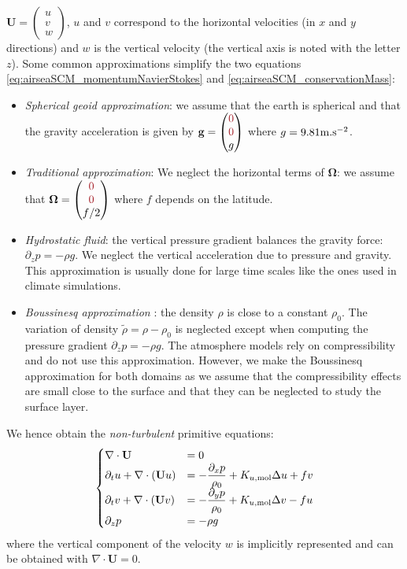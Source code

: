 $\mathbf{U} = \begin{pmatrix}u\\v\\w\end{pmatrix}$, $u$ and $v$
correspond to the horizontal velocities (in $x$ and $y$ directions)
and $w$ is the vertical velocity (the vertical axis is noted
with the letter $z$).
Some common approximations simplify the two equations
\eqref{eq:airseaSCM_momentumNavierStokes} and
\eqref{eq:airseaSCM_conservationMass}:
\begin{itemize}
\item \textit{Spherical geoid approximation}:
we assume that the earth is spherical and that the
gravity acceleration is given by
$\mathbf{g} =\begin{pmatrix}
	\emphase{0}\\ \emphase{0} \\ g
\end{pmatrix}$ where $g=9.81 {\rm m}.{\rm s}^{-2}$.
\item \textit{Traditional approximation}:
We neglect the horizontal terms of
$\mathbf{\Omega}$: we assume that
$\mathbf{\Omega} =\begin{pmatrix}
	\emphase{0}\\ \emphase{0} \\ f/2
\end{pmatrix}$ where $f$ depends on the latitude.
\item \textit{Hydrostatic fluid}:
the vertical pressure gradient balances the gravity force:
$\partial_z p = -\rho g$. We neglect the vertical
acceleration due to pressure and gravity.
This approximation is usually done for large time
scales like the ones used in climate simulations.
\item \textit{Boussinesq approximation}
\citep{boussinesq_theorie_1903}:
the density $\rho$ is close to a constant $\rho_0$.
The variation of density $\widetilde{\rho} =
\rho - \rho_0$ is neglected except when computing
the pressure gradient $\partial_z p = - \rho g$.
The atmosphere models rely on compressibility and
do not use this approximation. However, we make
the Boussinesq approximation for both domains
as we assume that the compressibility effects
are small close to the surface and that they
can be neglected to study the surface layer.
\end{itemize}
We hence obtain the \textit{non-turbulent}
primitive equations:
\begin{equation}
	\label{eq:airseaSCM_nonTurbulentPrimitiveEq}
\begin{cases}
	\nabla \cdot \mathbf{U} &= 0 \\
	\partial_t u + \nabla \cdot (\mathbf{U} u) &=
	- \displaystyle \frac{\partial_x p}{\rho_0} + K_{u, {\rm mol}} \Delta u
	+ f v \\
	\partial_t v + \nabla \cdot (\mathbf{U} v) &=
	- \displaystyle\frac{\partial_y p}{\rho_0} + K_{u, {\rm mol}} \Delta v
	- f u \\
	\partial_z p &= -\rho g
\end{cases}
\end{equation}
where the vertical component of the velocity $w$ is implicitly
represented and can be obtained with
$\nabla \cdot \mathbf{U} = 0$.
